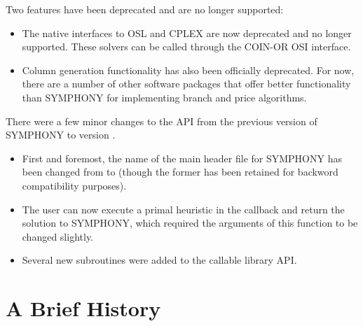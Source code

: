 Two features have been deprecated and are no longer supported:

\begin{itemize}

\item The native interfaces to OSL and CPLEX are now deprecated and no longer
supported. These solvers can be called through the COIN-OR OSI interface.

\item Column generation functionality has also been officially deprecated. For
now, there are a number of other software packages that offer better
functionality than SYMPHONY for implementing branch and price algorithms.

\end{itemize}

There were a few minor changes to the API from the previous version of
SYMPHONY to version \VER. 

\begin{itemize}

\item First and foremost, the name of the main header file for SYMPHONY has
been changed from  to  (though the
former has been retained for backword compatibility purposes).

\item The user can now execute a primal heuristic in the
 callback and return the solution to SYMPHONY, which
required the arguments of this function to be changed slightly.

\item Several new subroutines were added to the callable library API.

\end{itemize}

\section{A Brief History}
\label{history}

